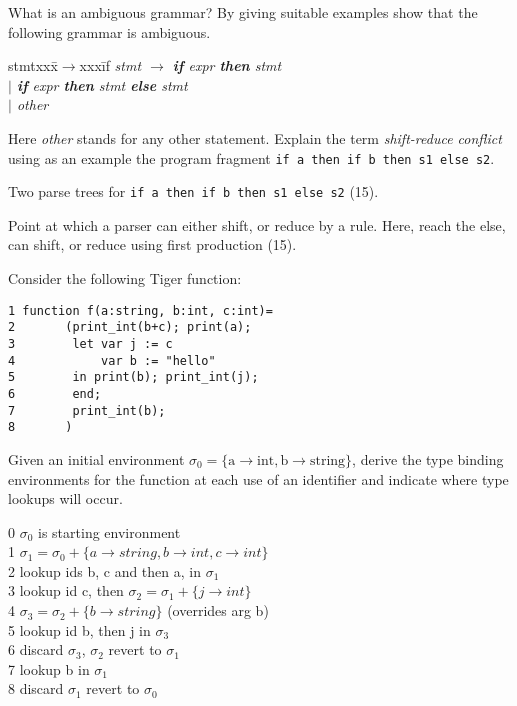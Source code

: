 \documentclass[11pt]{cityexam}
\begin{document}
\begin{questions}
\begin{subquestions}
\subquestion
What is an ambiguous grammar? By giving suitable examples show that the
        following grammar is ambiguous. 
\begin{tabbing}
stmtxxx\=$\rightarrow$xxx\=if\kill
\it
stmt \> $\rightarrow$ \> \textbf{if} {\it expr\/} \textbf{then} {\it stmt} \\
\it
     \> $\mid$ \> \textbf{if} {\it expr\/} \textbf{then} {\it stmt\/} \textbf{else} {\it stmt} \\
     \> $\mid$ \> {\it other}
\end{tabbing}
Here {\it other\/} stands for any other statement.
Explain the term {\em shift-reduce conflict\/} using as
an example the program fragment \verb+if a then if b then s1 else s2+.

\begin{modelanswer}
Two parse trees for \verb"if a then if b then s1 else s2" (15).

Point at which a parser can either shift, or reduce by a rule. 
Here, reach the else, can shift, or reduce using first production (15).
\end{modelanswer}


\subquestion
Consider the following Tiger function:
\begin{verbatim}
1 function f(a:string, b:int, c:int)=
2       (print_int(b+c); print(a);
3        let var j := c
4            var b := "hello"
5        in print(b); print_int(j);
6        end;
7        print_int(b);
8       )
\end{verbatim}
Given an initial environment $\sigma_0 = \{\textrm{a} \rightarrow \textrm{int}, \textrm{b} \rightarrow \textrm{string}\}$, derive the type binding environments for the function at each
use of an identifier and indicate where type lookups will occur.

\begin{modelanswer}
0 $\sigma_0$ is starting environment\\
1 $\sigma_1 = \sigma_0 + \{a\rightarrow string,b\rightarrow int,c\rightarrow int\}$\\
2 lookup ids b, c  and then a, in $\sigma_1$\\
3 lookup id c, then $\sigma_2 = \sigma_1 + \{j\rightarrow int\}$\\
4 $\sigma_3 = \sigma_2 + \{b\rightarrow string\}$ (overrides arg b)\\
5 lookup id b, then j  in $\sigma_3$\\
6 discard $\sigma_3$, $\sigma_2$ revert to $\sigma_1$\\
7 lookup b in $\sigma_1$\\
8 discard $\sigma_1$ revert to $\sigma_0$
\end{modelanswer}



\end{subquestions}
\end{questions}
\end{document}
